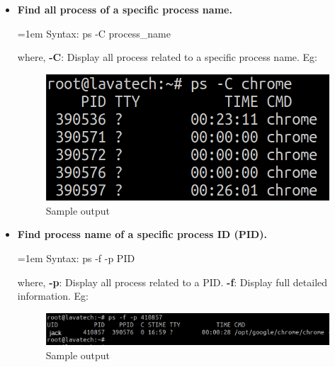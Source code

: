 \begin{flushleft}
\begin{itemize}
\begin{itemize}
		
		\item \textbf{Find all process of a specific process name.}
		\bigskip
		\begin{tcolorbox}[breakable,notitle,boxrule=-0pt,colback=pink,colframe=pink]
			\color{black}
			\font=1em
			Syntax: ps -C process\_name
			\font=4pt
		\end{tcolorbox}	
		where,
		\newline
		\textbf{-C}: Display all process related to a specific process name.
		\newline
		Eg:
		\begin{figure}[h!]
			\centering
			\includegraphics[scale=.4]{content/chapter12/images/ps_u.png}
			\caption{Sample output}
			\label{fig:process23454}
		\end{figure}
			
		\bigskip
		\bigskip
		
		\item \textbf{Find process name of a specific process ID (PID).}
		\bigskip
		\begin{tcolorbox}[breakable,notitle,boxrule=-0pt,colback=pink,colframe=pink]
			\color{black}
			\font=1em
			Syntax: ps -f -p  PID
			\font=4pt
		\end{tcolorbox}	
		where,
		\newline
		\textbf{-p}: Display all process related to a PID.
		\newline
		\textbf{-f}: Display full detailed information.
		\newline
		Eg:
		\begin{figure}[h!]
			\centering
			\includegraphics[scale=.3]{content/chapter12/images/ps_p.png}
			\caption{Sample output}
			\label{fig:process234549}
		\end{figure}
							

\end{itemize}
\end{itemize}
\end{flushleft}
